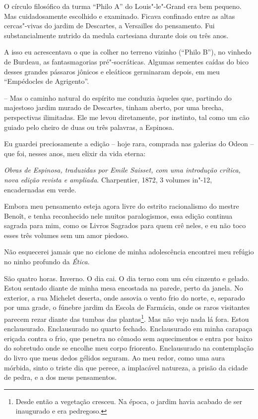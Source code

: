 O círculo filosófico da turma ``Philo A'' do Louis"-le"-Grand era bem
pequeno. Mas cuidadosamente escolhido e examinado. Ficava confinado
entre as altas cercas"-vivas do jardim de Descartes, a Versailles do
pensamento. Fui substancialmente nutrido da medula cartesiana durante
dois ou três anos.

A isso eu acrescentava o que ia colher no terreno
vizinho (``Philo B''), no vinhedo de Burdeau, as fantasmagorias
pré"-socráticas. Algumas sementes caídas do bico desses grandes pássaros
jônicos e eleáticos germinaram depois, em meu ``Empédocles de
Agrigento''.

-- Mas o caminho natural do espírito me conduzia àqueles
que, partindo do majestoso jardim murado de Descartes, tinham aberto,
por uma brecha, perspectivas ilimitadas. Ele me levou diretamente, por
instinto, tal como um cão guiado pelo cheiro de duas ou três palavras, a
Espinosa.

Eu guardei preciosamente a edição -- hoje rara, comprada nas galerias do
Odeon -- que foi, nesses anos, meu elixir da vida eterna:

\emph{Obras de
Espinosa, traduzidas por Emile Saisset, com uma introdução crítica, nova
edição revista e ampliada}. Charpentier, 1872, 3 volumes in"-12,
encadernadas em verde.

Embora meu pensamento esteja agora livre do estrito racionalismo do
mestre Benoît, e tenha reconhecido nele muitos paralogismos, essa edição
continua sagrada para mim, como os Livros Sagrados para quem crê neles,
e eu não toco esses três volumes sem um amor piedoso.

Não esquecerei jamais que no ciclone de minha adolescência encontrei meu
refúgio no ninho profundo da \emph{Ética}.

São quatro horas. Inverno. O dia cai. O dia terno com um céu cinzento e
gelado. Estou sentado diante de minha mesa encostada na parede, perto da
janela. No exterior, a rua Michelet deserta, onde assovia o vento frio
do norte, e, separado por uma grade, o fúnebre jardim da Escola de
Farmácia, onde os raros visitantes parecem rezar diante das tumbas das
plantas\footnote{Desde então a vegetação cresceu. Na época, o jardim
  havia acabado de ser inaugurado e era pedregoso.}. Mas não vejo nada
lá fora. Estou enclausurado. Enclausurado no quarto fechado.
Enclausurado em minha carapaça eriçada contra o frio, que penetra no
cômodo sem aquecimentos e entra por baixo do sobretudo onde se encolhe
meu corpo friorento. Enclausurado na contemplação do livro que meus
dedos gélidos seguram. Ao meu redor, como uma aura mórbida, sinto o
triste dia que perece, a implacável natureza, a prisão da cidade de
pedra, e a dos meus pensamentos.

